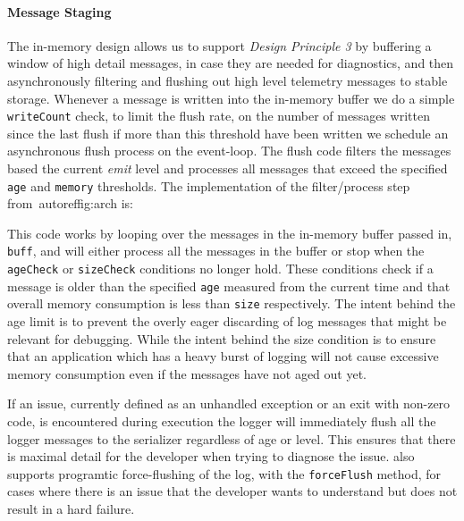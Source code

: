 \paragraph{Message Staging}
\noindent
The in-memory design allows us to support \emph{Design Principle 3} by buffering a 
window of high detail messages, in case they are needed for diagnostics, and then 
asynchronously filtering and flushing out high level telemetry messages to stable 
storage. Whenever a message is written into the in-memory buffer we do a simple 
\texttt{writeCount} check, to limit the flush rate, on the number of messages written 
since the last flush if more than this threshold have been written we schedule an 
asynchronous flush process on the event-loop. The flush code filters the messages 
based the current \emph{emit} level and processes all messages that exceed the 
specified \texttt{age} and \texttt{memory} thresholds. The implementation of the 
filter/process step from~autoref{fig:arch} is:



This code works by looping over the messages in the in-memory buffer passed in, 
\lstinline!buff!, and will either process all the messages in the buffer or 
stop when the \lstinline!ageCheck! or \lstinline!sizeCheck! conditions no longer 
hold. These conditions check if a message is older than the specified 
\lstinline!age! measured from the current time and that overall memory 
consumption is less than \lstinline!size! respectively. The intent behind the 
age limit is to prevent the overly eager discarding of log messages that might 
be relevant for debugging. While the intent behind the size condition is to ensure 
that an application which has a heavy burst of logging will not cause excessive 
memory consumption even if the messages have not aged out yet.

If an issue, currently defined as an unhandled exception or an exit with non-zero code, 
is encountered during execution the logger will immediately flush all the logger 
messages to the serializer regardless of age or level. This ensures that there is maximal 
detail for the developer when trying to diagnose the issue. \projn also supports 
programtic force-flushing of the log, with the \texttt{forceFlush} method, for cases where there 
is an issue that the developer wants to understand but does not result in a hard failure. 

